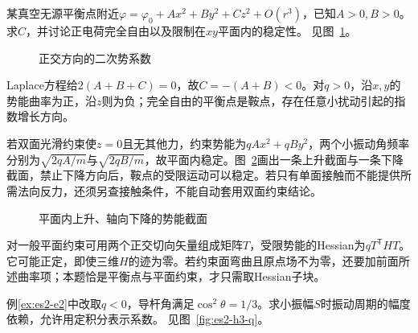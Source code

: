 \begin{exercise}[平衡点的二阶曲率]\label{ex:es2-h2}
某真空无源平衡点附近$\varphi=\varphi_0+A x^2+B y^2+C z^2+O(r^3)$，已知$A>0,B>0$。求$C$，并讨论正电荷完全自由以及限制在$xy$平面内的稳定性。 见图~\ref{fig:es2-h2-q}。
\end{exercise}

\begin{figure}[H]\centering
{}
\caption{正交方向的二次势系数}\label{fig:es2-h2-q}
\end{figure}
\begin{solution}
Laplace方程给$2(A+B+C)=0$，故$C=-(A+B)<0$。对$q>0$，沿$x,y$的势能曲率为正，沿$z$则为负；完全自由的平衡点是鞍点，存在任意小扰动引起的指数增长方向。

若双面光滑约束使$z=0$且无其他力，约束势能为$qAx^2+qBy^2$，两个小振动角频率分别为$\sqrt{2qA/m}$与$\sqrt{2qB/m}$，故平面内稳定。图~\ref{fig:es2-h2-s}画出一条上升截面与一条下降截面，禁止下降方向后，鞍点的受限运动可以稳定。若只有单面接触而不能提供所需法向反力，还须另查接触条件，不能自动套用双面约束结论。
\begin{figure}[H]\centering
{}
\caption{平面内上升、轴向下降的势能截面}\label{fig:es2-h2-s}
\end{figure}


对一般平面约束可用两个正交切向矢量组成矩阵$T$，受限势能的Hessian为$qT^{\mathsf T}HT$。它可能正定，即使三维$H$的迹为零。若约束面弯曲且原点场不为零，还要加前面所述曲率项；本题恰是平衡点与平面约束，才只需取Hessian子块。
\end{solution}

\begin{exercise}[临界导杆上的负电小珠]\label{ex:es2-h3}
例\ref{ex:es2-e2}中改取$q<0$，导杆角满足$\cos^2\theta=1/3$。求小振幅$S$时振动周期的幅度依赖，允许用定积分表示系数。 见图~\ref{fig:es2-h3-q}。
\end{exercise}

